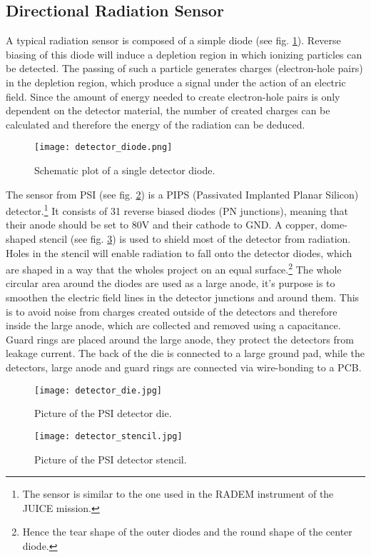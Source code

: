 \subsection{Directional Radiation Sensor}
\label{sec:radiation_sensor}
A typical radiation sensor is composed of a simple diode (see fig. \ref{fig:detector_diode}).
Reverse biasing of this diode will induce a depletion region in which ionizing particles can be detected.
The passing of such a particle generates charges (electron-hole pairs) in the depletion region, which produce a signal under the action of an electric field.
Since the amount of energy needed to create electron-hole pairs is only dependent on the detector material, the number of created charges can be calculated and therefore the energy of the radiation can be deduced.\cite{rossi2006pixel}

\begin{figure}[H]
    \centering
    \texttt{[image: detector\_diode.png]}
    \caption[Schematic Detector Diode]{Schematic plot of a single detector diode.\cite{am2016semiconductor}}
    \label{fig:detector_diode}
\end{figure}

The sensor from PSI (see fig. \ref{fig:detector_die}) is a PIPS (Passivated Implanted Planar Silicon) detector.\footnote{The sensor is similar to the one used in the RADEM instrument of the JUICE mission.}
It consists of 31 reverse biased diodes (PN junctions), meaning that their anode should be set to 80V and their cathode to GND.
A copper, dome-shaped stencil (see fig. \ref{fig:detector_stencil}) is used to shield most of the detector from radiation.
Holes in the stencil will enable radiation to fall onto the detector diodes, which are shaped in a way that the wholes project on an equal surface.\footnote{Hence the tear shape of the outer diodes and the round shape of the center diode.}
The whole circular area around the diodes are used as a large anode, it's purpose is to smoothen the electric field lines in the detector junctions and around them.
This is to avoid noise from charges created outside of the detectors and therefore inside the large anode, which are collected and removed using a capacitance.
Guard rings are placed around the large anode, they protect the detectors from leakage current.
The back of the die is connected to a large ground pad, while the detectors, large anode and guard rings are connected via wire-bonding to a PCB.

\begin{figure}[H]
    \centering
    \texttt{[image: detector\_die.jpg]}
    \caption[PSI Detector Die]{Picture of the PSI detector die.}
    \label{fig:detector_die}
\end{figure}

\begin{figure}[H]
    \centering
    \texttt{[image: detector\_stencil.jpg]}
    \caption[PSI Detector Stencil]{Picture of the PSI detector stencil.}
    \label{fig:detector_stencil}
\end{figure}
